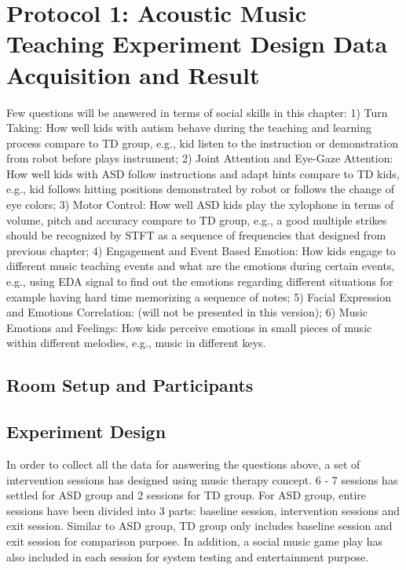 \chapter{Protocol 1: Acoustic Music Teaching Experiment Design Data Acquisition and Result}
Few questions will be answered in terms of social skills in this chapter:
1) Turn Taking: How well kids with autism behave during the teaching and learning
process compare to TD group, e.g., kid listen to the instruction or demonstration 
from robot before plays instrument;
2) Joint Attention and Eye-Gaze Attention: How well kids with ASD follow instructions 
and adapt hints compare to TD kids, e.g., kid follows hitting positions demonstrated 
by robot or follows the change of eye colors;
3) Motor Control: How well ASD kids play the xylophone in terms of volume, pitch and
accuracy compare to TD group, e.g., a good multiple strikes should be recognized by 
STFT as a sequence of frequencies that designed from previous chapter;
4) Engagement and Event Based Emotion: How kids engage to different music teaching
events and what are the emotions during certain events, e.g., using EDA signal to
find out the emotions regarding different situations for example having hard time
memorizing a sequence of notes;
5) Facial Expression and Emotions Correlation: (will not be presented in this version);
6) Music Emotions and Feelings: How kids perceive emotions in small pieces of music 
within different melodies, e.g., music in different keys.\\

\section{Room Setup and Participants}

\section{Experiment Design}
In order to collect all the data for answering the questions above, a set of
intervention sessions has designed using music therapy concept. 6 - 7 sessions
has settled for ASD group and 2 sessions for TD group. For ASD group, entire
sessions have been divided into 3 parts: baseline session, intervention sessions
and exit session. Similar to ASD group, TD group only includes baseline session
and exit session for comparison purpose. In addition, a social music
game play has also included in each session for system testing and entertainment
purpose.\\

